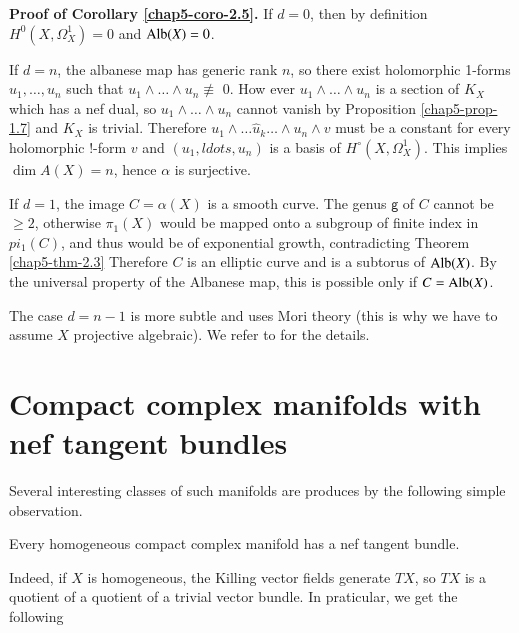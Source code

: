 \noindent
\textbf{Proof of Corollary \ref{chap5-coro-2.5}.}
If $d=0$, then by definition $H^{0}(X, \Omega_{X}^{1}) = 0$ and $\operatorname{Alb}(X) = {0}$.

If $d=n$, the albanese map has generic rank $n$, so there exist holomorphic 1-forms $u_{1}, \ldots, u_{n}$ such that $u_{1}\wedge \ldots \wedge u_{n} \nequiv$ 0. How ever $u_{1}\wedge \ldots \wedge u_{n}$ is a section of $K_{X}$ which has a nef dual, so $u_{1} \wedge \ldots \wedge u_{n}$ cannot vanish by Proposition \ref{chap5-prop-1.7} and $K_{X}$ is trivial. Therefore $u_{1} \wedge \ldots \hat{u}_{k}\ldots \wedge u_{n} \wedge v$ must be a constant for every holomorphic !-form $v$ and $(u_{1}, ldots, u_{n})$ is a basis of $H^{\circ}(X, \Omega_{X}^{1})$. This implies $\dim A(X)= n$, hence $\alpha$ is surjective.

If $d =1$, the image $C=\alpha(X)$ is a smooth curve. The genus $\mathsf{g}$ of $C$ cannot be $\geq 2$, otherwise $\pi_{1}(X)$ would be mapped onto a subgroup of finite index in $pi_{1}(C)$, and thus would be of exponential growth, contradicting Theorem \ref{chap5-thm-2.3} Therefore $C$ is an elliptic curve and is a subtorus of $\operatorname{Alb}(X)$. By the universal property of the Albanese map, this is possible only if $C= \operatorname{Alb}(X)$.

The case $d =n-1$ is more subtle and uses Mori theory (this is why we have to assume $X$ projective algebraic). We refer to \cite{chap5-keyDPS92} for the details.

\section{Compact complex manifolds with nef tangent bundles}\label{chap5-sec-3}

Several interesting classes of such manifolds are produces by the following simple observation.

\begin{secprop}\label{chap5-prop-3.1}
Every homogeneous compact complex manifold has a nef tangent bundle.
\end{secprop}

Indeed, if $X$ is homogeneous, the Killing vector fields generate $TX$, so $TX$ is a quotient of a quotient of a trivial vector bundle. In praticular, we get the following

